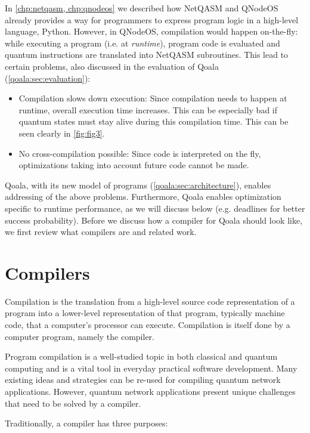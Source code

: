 In \cref{chp:netqasm, chp:qnodeos} we described how NetQASM and QNodeOS already provides a way for programmers to express program logic in a high-level language, Python.
However, in \ac{QNodeOS}, compilation would happen on-the-fly:
while executing a program (i.e. at \emph{runtime}), program code is evaluated and quantum instructions are translated into NetQASM subroutines.
This lead to certain problems, also discussed in the evaluation of Qoala (\cref{qoala:sec:evaluation}):
\begin{itemize}
  \item Compilation slows down execution:
    Since compilation needs to happen at runtime, overall execution time increases.
    This can be especially bad if quantum states must stay alive during this compilation time.
    This can be seen clearly in \cref{fig:fig3}.
  \item No cross-compilation possible:
    Since code is interpreted on the fly, optimizations taking into account future code cannot be made. 
\end{itemize}

Qoala, with its new model of programs (\cref{qoala:sec:architecture}), enables addressing of the above problems.
Furthermore, Qoala enables optimization specific to runtime performance, as we will discuss below (e.g. deadlines for better success probability).
Before we discuss how a compiler for Qoala should look like, we first review what compilers are and related work.


\section{Compilers}
Compilation is the translation from a high-level source code representation of a program into a lower-level representation of that program, typically machine code, that a computer's processor can execute.
Compilation is itself done by a computer program, namely the compiler.

Program compilation is a well-studied topic in both classical and quantum computing and is a vital tool in everyday practical software development.
Many existing ideas and strategies can be re-used for compiling quantum network applications.
However, quantum network applications present unique challenges that need to be solved by a compiler.

Traditionally, a compiler has three purposes:

